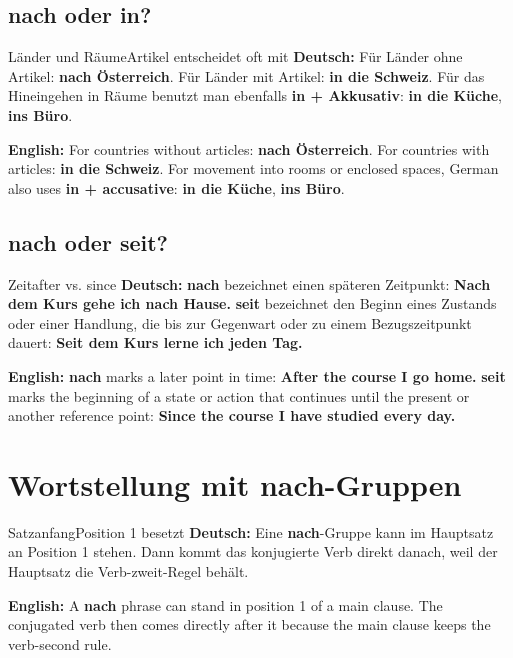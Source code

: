 \documentclass[a4paper,11pt]{article}
\newcommand{\GermanText}[1]{\textbf{Deutsch: }#1\par}
\newcommand{\EnglishText}[1]{{\small\color{SoftGray}\textbf{English: }#1\par}}
\begin{document}
        \subsection{nach oder in?}

        \begin{grammarentry}{Länder und Räume}{Artikel entscheidet oft mit}
            \GermanText{Für Länder ohne Artikel: \textbf{nach Österreich}. Für Länder mit Artikel: \textbf{in die Schweiz}. Für das Hineingehen in Räume benutzt man ebenfalls \textbf{in + Akkusativ}: \textbf{in die Küche}, \textbf{ins Büro}.}
            \EnglishText{For countries without articles: \textbf{nach Österreich}. For countries with articles: \textbf{in die Schweiz}. For movement into rooms or enclosed spaces, German also uses \textbf{in + accusative}: \textbf{in die Küche}, \textbf{ins Büro}.}
        \end{grammarentry}

        \subsection{nach oder seit?}

        \begin{grammarentry}{Zeit}{after vs. since}
            \GermanText{\textbf{nach} bezeichnet einen späteren Zeitpunkt: \textbf{Nach dem Kurs gehe ich nach Hause.} \textbf{seit} bezeichnet den Beginn eines Zustands oder einer Handlung, die bis zur Gegenwart oder zu einem Bezugszeitpunkt dauert: \textbf{Seit dem Kurs lerne ich jeden Tag.}}
            \EnglishText{\textbf{nach} marks a later point in time: \textbf{After the course I go home.} \textbf{seit} marks the beginning of a state or action that continues until the present or another reference point: \textbf{Since the course I have studied every day.}}
        \end{grammarentry}


    \section{Wortstellung mit nach-Gruppen}

        \begin{grammarentry}{Satzanfang}{Position 1 besetzt}
            \GermanText{Eine \textbf{nach}-Gruppe kann im Hauptsatz an Position 1 stehen. Dann kommt das konjugierte Verb direkt danach, weil der Hauptsatz die Verb-zweit-Regel behält.}
            \EnglishText{A \textbf{nach} phrase can stand in position 1 of a main clause. The conjugated verb then comes directly after it because the main clause keeps the verb-second rule.}
        \end{grammarentry}
\end{document}

